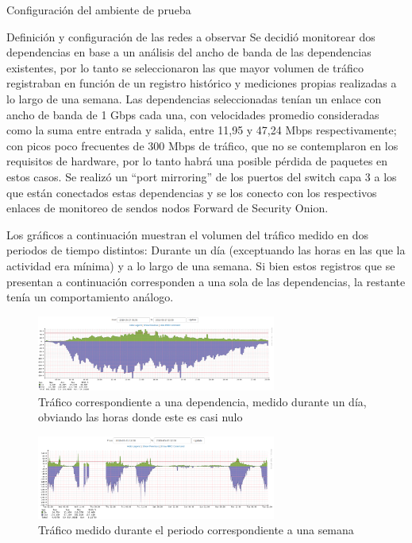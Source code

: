 \begin{section}{Configuración del ambiente de prueba}
        \begin{subsection}{Definición y configuración de las redes a observar}
            Se decidió monitorear dos dependencias en base a un análisis del ancho de banda de las dependencias existentes, por lo tanto se seleccionaron las que mayor volumen de tráfico registraban en función de un registro histórico y mediciones propias realizadas a lo largo de una semana. Las dependencias seleccionadas tenían un enlace con ancho de banda de 1 Gbps cada una, con  velocidades promedio consideradas como la suma entre entrada y salida, entre 11,95 y 47,24 Mbps respectivamente; con picos poco frecuentes de 300 Mbps de tráfico, que no se contemplaron en los requisitos de hardware, por lo tanto habrá una posible pérdida de paquetes en estos casos. Se realizó un “port mirroring” de los puertos del switch capa 3 a los que están conectados estas dependencias y se los conecto con los respectivos enlaces de monitoreo de sendos nodos Forward de Security Onion. \par
            Los gráficos a continuación muestran el volumen del tráfico medido en dos periodos de tiempo distintos: Durante un día (exceptuando las horas en las que la actividad era mínima) y a lo largo de una semana. Si bien estos registros que se presentan a continuación corresponden a una sola de las dependencias, la restante tenía un comportamiento análogo. \par
            
            \begin{figure}[H]
                \centering
                \includegraphics[width=0.7\textwidth]{./iteracion_2_imagenes/figura_35_trafico_dia.png}
                \caption{Tráfico correspondiente a una dependencia, medido durante un día, obviando las horas donde este es casi nulo}
                \label{fig:figura_35_trafico_dia}
            \end{figure}
            \begin{figure}[H]
            \centering
            \includegraphics[width=0.7\textwidth]{./iteracion_2_imagenes/figura_36_trafico_semana.png}
            \caption{Tráfico medido durante el periodo correspondiente a una semana}
            \label{fig:figura_36_trafico_semana}
            \end{figure}
        \end{subsection}
    \end{section}
    
